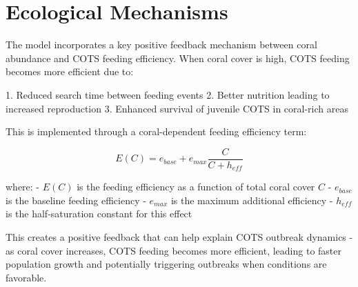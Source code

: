 \section{Ecological Mechanisms}

The model incorporates a key positive feedback mechanism between coral abundance and COTS feeding efficiency. When coral cover is high, COTS feeding becomes more efficient due to:

1. Reduced search time between feeding events
2. Better nutrition leading to increased reproduction
3. Enhanced survival of juvenile COTS in coral-rich areas

This is implemented through a coral-dependent feeding efficiency term:

\[ E(C) = e_{base} + e_{max}\frac{C}{C + h_{eff}} \]

where:
- $E(C)$ is the feeding efficiency as a function of total coral cover $C$
- $e_{base}$ is the baseline feeding efficiency
- $e_{max}$ is the maximum additional efficiency
- $h_{eff}$ is the half-saturation constant for this effect

This creates a positive feedback that can help explain COTS outbreak dynamics - as coral cover increases, COTS feeding becomes more efficient, leading to faster population growth and potentially triggering outbreaks when conditions are favorable.
